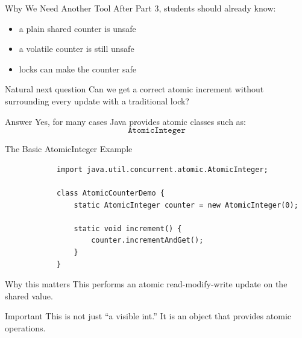 \documentclass[aspectratio=169,11pt]{beamer}
\begin{document}
	\begin{frame}{Why We Need Another Tool}
		After Part 3, students should already know:
		
		\begin{itemize}
			\item a plain shared counter is unsafe
			\item a volatile counter is still unsafe
			\item locks can make the counter safe
		\end{itemize}
		
		\vspace{0.35cm}
		
		\begin{exampleblock}{Natural next question}
			Can we get a correct atomic increment without surrounding every update with a traditional lock?
		\end{exampleblock}
		
		\vspace{0.3cm}
		
		\begin{block}{Answer}
			Yes, for many cases Java provides atomic classes such as:
			\[
			\texttt{AtomicInteger}
			\]
		\end{block}
	\end{frame}
	
	\begin{frame}[fragile]{The Basic AtomicInteger Example}
		\begin{lstlisting}
			import java.util.concurrent.atomic.AtomicInteger;
			
			class AtomicCounterDemo {
				static AtomicInteger counter = new AtomicInteger(0);
				
				static void increment() {
					counter.incrementAndGet();
				}
			}
		\end{lstlisting}
		
		\vspace{0.25cm}
		
		\begin{block}{Why this matters}
			This performs an atomic read-modify-write update on the shared value.
		\end{block}
		
		\vspace{0.25cm}
		
		\begin{alertblock}{Important}
			This is not just ``a visible int.''  
			It is an object that provides atomic operations.
		\end{alertblock}
	\end{frame}
	
\end{document}

